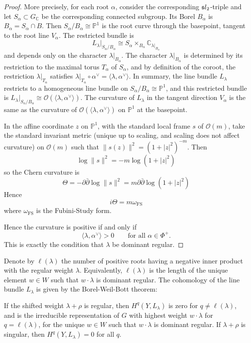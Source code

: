 \documentclass[12pt]{article}
\begin{document}
\begin{proof}
More precisely, for each root $\alpha$, consider the corresponding $\mathfrak{s}l_2$-triple and let $S_\alpha\subset G_{\mathbb C}$ be the corresponding connected subgroup. Its Borel $B_\alpha$ is
$B_\alpha = S_\alpha \cap B$. Then
$S_\alpha/B_\alpha \cong \mathbb P^1$
is the root curve through the basepoint, tangent to the root line $V_\alpha$. The restricted bundle is
\[L_\lambda|_{S_\alpha/B_\alpha}
\cong
S_\alpha \times_{B_\alpha} \mathbb C_{\lambda|_{B_\alpha}}\]
and depends only on the character
$\lambda|_{B_\alpha}$. The character $\lambda|_{B_\alpha}$ is determined by its restriction to the maximal torus $T_\alpha$ of $S_\alpha$, and by definition of the coroot, the restriction $\lambda|_{T_\alpha}$ satisfies $\lambda |_{T_\alpha}\circ \alpha^\vee = \langle \lambda,\alpha^\vee\rangle$. 
In summary, the line bundle $L_\lambda$ restricts to a homogeneous line bundle on
$S_\alpha/B_\alpha \cong \mathbb P^1$,
and this restricted bundle is
$L_\lambda|_{S_\alpha/B_\alpha}\cong \mathcal O(\langle \lambda,\alpha^\vee\rangle)$. The curvature of $L_\lambda$ in the tangent direction $V_\alpha$ is the same as the curvature of $\mathcal O(\langle \lambda,\alpha^\vee\rangle)$ on $\mathbb P^1$ at the basepoint.

In the affine coordinate $z$ on $\mathbb P^1$, with the standard local frame $s$ of $\mathcal O(m)$, take the standard invariant metric (unique up to scaling, and scaling does not affect curvature) on $\mathcal O(m)$ such that
$\|s(z)\|^2=(1+|z|^2)^{-m}$.
Then
\[\log \|s\|^2=-m\log(1+|z|^2)\]
so the Chern curvature is \[
\Theta = -\partial\bar\partial \log \|s\|^2
= m\partial\bar\partial \log(1+|z|^2)\]
Hence
\[i\Theta = m\omega_{\mathrm{FS}}\]
where $\omega_{\mathrm{FS}}$ is the Fubini-Study form.

Hence the curvature is positive if and only if
\[
\langle \lambda,\alpha^\vee\rangle>0
\qquad
\text{for all } \alpha\in\Phi^+.
\]
This is exactly the condition that \(\lambda\) be dominant regular.
\end{proof}

Denote by \(\ell(\lambda)\) the number of positive roots having a negative inner product with the regular weight \(\lambda\). Equivalently, \(\ell(\lambda)\) is the length of the unique element \(w\in W\) such that \(w\cdot \lambda\) is dominant regular. The cohomology of the line bundle \(L_\lambda\) is given by the Borel-Weil-Bott theorem:

\begin{theorem}
    If the shifted weight $\lambda+\rho$ is regular, then $H^q(Y,L_\lambda)$ is zero for $q\neq \ell(\lambda)$, and is the irreducible representation of $G$ with highest weight $w\cdot \lambda$ for $q=\ell(\lambda)$, for the unique $w\in W$ such that $w\cdot \lambda$ is dominant regular. If $\lambda+\rho$ is singular, then $H^q(Y,L_\lambda)=0$ for all $q$.
\end{theorem}
\end{document}
